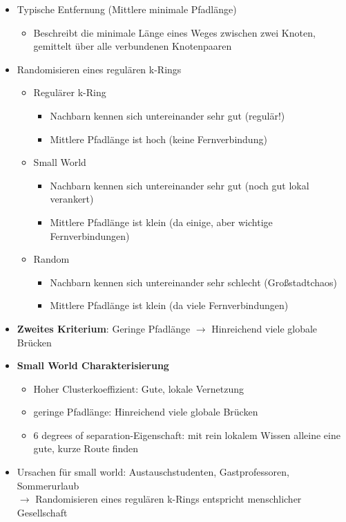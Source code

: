 \documentclass{article} %
\begin{document}
\begin{itemize}
\begin{itemize}
\begin{center}
			\end{center}
		\end{itemize}
		\item Typische Entfernung (Mittlere minimale Pfadlänge)
		\begin{itemize}
			\item Beschreibt die minimale Länge eines Weges zwischen zwei Knoten, gemittelt über alle verbundenen Knotenpaaren
		\end{itemize}
		\item Randomisieren eines regulären k-Rings
		\begin{itemize}
			\item Regulärer k-Ring
			\begin{itemize}
				\item Nachbarn kennen sich untereinander sehr gut (regulär!)
				\item Mittlere Pfadlänge ist hoch (keine Fernverbindung)
			\end{itemize}
			\item Small World
			\begin{itemize}
				\item Nachbarn kennen sich untereinander sehr gut (noch gut lokal verankert)
				\item Mittlere Pfadlänge ist klein (da einige, aber wichtige Fernverbindungen)
			\end{itemize}
			\item Random 
			\begin{itemize}
				\item Nachbarn kennen sich untereinander sehr schlecht (Großstadtchaos)
				\item Mittlere Pfadlänge ist klein (da viele Fernverbindungen)
			\end{itemize}
		\end{itemize}
		\item \textbf{Zweites Kriterium}: Geringe Pfadlänge $\rightarrow$ Hinreichend viele globale Brücken
		\item \textbf{Small World Charakterisierung}
		\begin{itemize}
			\item Hoher Clusterkoeffizient: Gute, lokale Vernetzung
			\item geringe Pfadlänge: Hinreichend viele globale Brücken
			\item 6 degrees of separation-Eigenschaft: mit rein lokalem Wissen alleine eine gute, kurze Route finden
		\end{itemize}
		\item Ursachen für small world: Austauschstudenten, Gastprofessoren, Sommerurlaub\\
		$\rightarrow$ Randomisieren eines regulären k-Rings entspricht menschlicher Gesellschaft
	\end{itemize}
\end{document}
